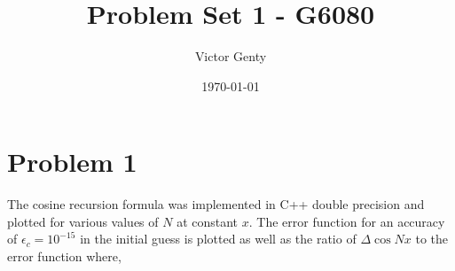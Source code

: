 \documentclass[singlepage,notitlepage,nofootinbib,11pt]{revtex4-1}
\begin{document}
\title{Problem Set 1 - G6080}
\author{Victor Genty}
\date{\today}
\maketitle
\section{Problem 1}
The cosine recursion formula  was implemented in C++ double precision and plotted for various values of $N$ at constant $x$. The error function for an accuracy of $\epsilon_c = 10^{-15}$ in the initial guess is plotted as well as the ratio of $\Delta\cos Nx$ to the error function where,
\end{document}
